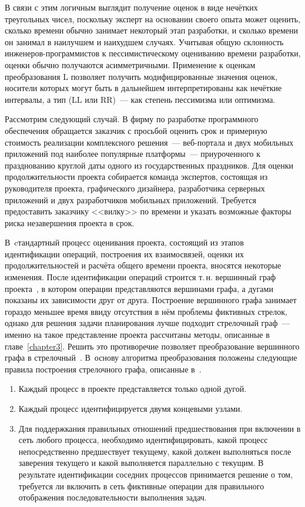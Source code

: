 В связи с этим логичным выглядит получение оценок в виде нечётких треугольных чисел, поскольку эксперт на основании своего опыта может оценить, сколько времени обычно занимает некоторый этап разработки, и сколько времени он занимал в наилучшем и наихудшем случаях. Учитывая общую склонность инженеров-программистов к пессимистическому оцениванию времени разработки, оценки обычно получаются асимметричными. Применение к оценкам преобразования L позволяет получить модифицированные значения оценок, носители которых могут быть в дальнейшем интерпретированы как нечёткие интервалы, а тип (LL или RR)~--- как степень пессимизма или оптимизма. 

Рассмотрим следующий случай. В фирму по разработке программного обеспечения обращается заказчик с просьбой оценить срок и примерную стоимость реализации комплексного решения~--- веб-портала и двух мобильных приложений под наиболее популярные платформы~--- приуроченного к празднованию круглой даты одного из государственных праздников. Для оценки продолжительности проекта собирается команда экспертов, состоящая из руководителя проекта, графического дизайнера, разработчика серверных приложений и двух разработчиков мобильных приложений. Требуется предоставить заказчику <<вилку>> по времени и указать возможные факторы риска незавершения проекта в срок.

В~cтандартный процесс оценивания проекта, состоящий из этапов идентификации операций, построения их взаимосвязей, оценки их продолжительностей и расчёта общего времени проекта, вносятся некоторые изменения. После идентификации операций строится т.\,н. вершинный граф проекта~\cite{Eddous, Taha_Operation_Research}, в котором операции представляются вершинами графа, а дугами показаны их зависимости друг от друга. Построение вершинного графа занимает гораздо меньшее время ввиду отсутствия в нём проблемы фиктивных стрелок, однако для решения задачи планирования лучше подходит стрелочный граф~--- именно на такое представление проекта рассчитаны методы, описанные в главе~\ref{chapter3}. Решить это противоречие позволяет преобразование вершинного графа в стрелочный~\cite{VSU-5y}. В~основу алгоритма преобразования положены следующие правила построения стрелочного графа, описанные в~\cite{Eddous, Taha_Operation_Research}.
\begin{enumerate}
\label{Taha:ConversionRules}
  \item Каждый процесс в проекте представляется только одной дугой.
  \item Каждый процесс идентифицируется двумя концевыми узлами.
  \item Для поддержкания правильных отношений предшествования при включении в сеть любого процесса, необходимо идентифицировать, какой процесс непосредственно предшествует текущему, какой должен выполняться после заверения текущего и какой выполняется параллельно с текущим. В результате идентификации соседних процессов принимается решение о том, требуется ли включить в сеть фиктивные операции для правильного отображения последовательности выполнения задач.
\end{enumerate}


